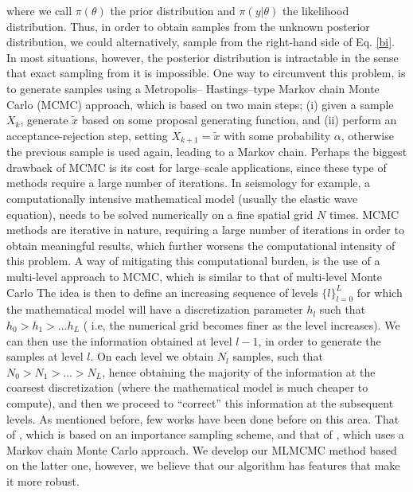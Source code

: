 where we call $\pi(\theta)$ the prior distribution and $\pi(y|\theta)$ the likelihood distribution. Thus, in order to obtain samples from the unknown posterior distribution, we could alternatively, sample from the right-hand side of Eq. \ref{bi}. In most situations, however, the posterior distribution is intractable in the sense that exact sampling from it is impossible. One way to circumvent this problem, is to generate samples using a Metropolis–
Hastings–type Markov chain Monte Carlo (MCMC) approach, which is based on two main steps; (i) given a sample $X_k$, generate $\tilde{x}$ based on some proposal generating function, and (ii) perform an acceptance-rejection step, setting $X_{k+1}=\tilde{x}$ with some probability $\alpha$, otherwise the previous sample is used again, leading to a Markov chain.  Perhaps the biggest drawback of MCMC is its cost for large–scale applications, since these type of methods require a large number of iterations. In seismology for example,  a computationally intensive mathematical model (usually the elastic wave equation), needs to be solved numerically on a fine spatial grid $N$ times. MCMC methods are iterative in nature, requiring a large number of iterations in order to obtain meaningful results, which further worsens the computational intensity of this problem. A way of mitigating this computational burden, is the use of a multi-level approach to  MCMC, which is similar to that of multi-level Monte Carlo \cite{giles2015multilevel} The idea is then to define an increasing sequence of levels $\{l\}_{l=0}^L$ for which the mathematical model will have a discretization parameter $h_l$ such that $h_0>h_1>\dots h_L$ ( i.e, the numerical grid becomes finer as the level increases). We can then use the information obtained at level $l-1$, in order to generate the samples at level $l$. On each level we obtain $N_l$ samples, such that $N_0>N_1>\dots> N_L$, hence obtaining the majority of the information at the coarsest discretization (where the mathematical model is much cheaper to compute), and then we proceed to ``correct'' this information at the subsequent levels. As mentioned before, few works have been done before on this area. That of \cite{hoang2013complexity}, which is based on an importance sampling scheme, and that of \cite{dodwell2015hierarchical}, which uses a Markov chain Monte Carlo approach. We develop our MLMCMC method based on the latter one, however, we believe that our algorithm has features that make it more 
robust.


